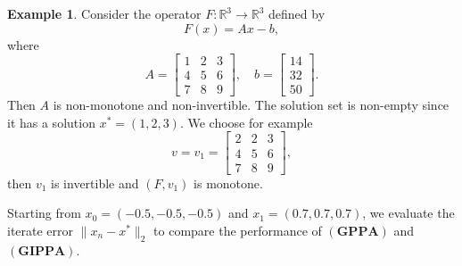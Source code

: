 \documentclass[11pt]{article}
\theoremstyle{definition}
\theoremstyle{definition}
\newtheorem{example}[theorem]{Example}
\theoremstyle{definition}
\begin{document}
\begin{example}
	
	Consider the operator \(F:\mathbb{R}^3 \to \mathbb{R}^3\) defined by
	\[
	F(x) = A x - b,
	\]
	where
	$$
	A =\begin{bmatrix} 1 & 2 & 3\\ 4 & 5 & 6 \\ 7 & 8 & 9\end{bmatrix},  \quad
	b = \begin{bmatrix} 14 \\ 32 \\ 50\end{bmatrix}.
	$$
	Then $A$ is non-monotone and non-invertible. The solution set is non-empty since it has a solution $x^*=(1,2,3)$.
	We choose for example
	$$
	v=v_1=\begin{bmatrix} 2 & 2 & 3\\ 4 & 5 & 6 \\ 7 & 8 & 9\end{bmatrix},
	$$
	then $v_1$ is invertible and $(F,v_1)$ is monotone.
	
	
	Starting from $x_0=(-0.5,-0.5,-0.5)$ and $x_1=(0.7,0.7,0.7)$, we evaluate the iterate error $\|x_n-x^*\|_2$ to compare the performance of $(\mathbf{GPPA})$ and $(\mathbf{GIPPA})$. 
	
	

\end{example}
\end{document}
